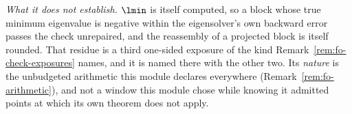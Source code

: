\begin{remark}
\emph{What it does not establish.} $\lmin$ is itself computed, so a block
whose true minimum eigenvalue is negative within the eigensolver's own
backward error passes the check unrepaired, and the reassembly of a
projected block is itself rounded. That residue is a third one-sided
exposure of the kind Remark~\ref{rem:fo-check-exposures} names, and it is
named there with the other two. Its \emph{nature} is the unbudgeted
arithmetic this module declares everywhere (Remark~\ref{rem:fo-arithmetic}),
and not a window this module chose while knowing it admitted points at which
its own theorem does not apply.
\end{remark}
